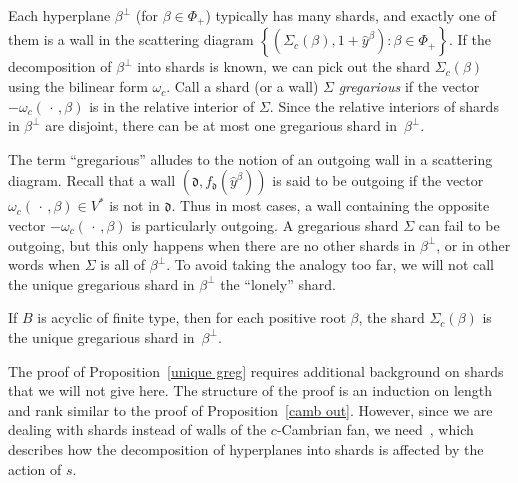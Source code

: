 \documentclass[ALCO,ThmDefs,Unicode,epreuves]{cedram}
\DeclareMathOperator{\CambScat}{CambScat}
\newcommand{\newword}[1]{\emph{#1}}
\newcommand{\set}[1]{{\left\lbrace #1 \right\rbrace}}
\renewcommand{\d}{{\mathfrak d}}
\newcommand{\hy}{\hat{y}}
\begin{document}
%

Each hyperplane $\beta^\perp$ (for $\beta\in\Phi_+$) typically has many shards, and exactly one of them is a wall in the scattering diagram $\set{(\Sigma_c(\beta),1+\hy^\beta):\beta\in\Phi_+}$.
If the decomposition of $\beta^\perp$ into shards is known, we can pick out the shard $\Sigma_c(\beta)$ using the bilinear form $\omega_c$.
Call a shard (or a wall) $\Sigma$ \newword{gregarious} if the vector $-\omega_c(\,\cdot\,,\beta)$ is in the relative interior of $\Sigma$.
Since the relative interiors of shards in $\beta^\perp$ are disjoint, there can be at most one gregarious shard in~$\beta^\perp$.

\begin{rema}\label{greg remark}
The term ``gregarious'' alludes to the notion of an outgoing wall in a scattering diagram.
Recall that a wall $(\d,f_\d(\hy^\beta))$ is said to be outgoing if the vector $\omega_c(\,\cdot\,,\beta)\in V^*$ is not in $\d$.
Thus in most cases, a wall containing the opposite vector $-\omega_c(\,\cdot\,,\beta)$ is particularly outgoing.
A gregarious shard $\Sigma$ can fail to be outgoing, but this only happens when there are no other shards in $\beta^\perp$, or in other words when $\Sigma$ is all of $\beta^\perp$.
To avoid taking the analogy too far, we will not call the unique gregarious shard in $\beta^\perp$ the ``lonely'' shard.
\end{rema}

\begin{prop}\label{unique greg}
If $B$ is acyclic of finite type, then for each positive root $\beta$, the shard $\Sigma_c(\beta)$ is the unique gregarious shard in~$\beta^\perp$.
\end{prop}

The proof of Proposition~\ref{unique greg} requires additional background on shards that we will not give here.
The structure of the proof is an induction on length and rank similar to the proof of Proposition~\ref{camb out}.
However, since we are dealing with shards instead of walls of the $c$-Cambrian fan, we need~\cite[Observation~4.7]{sort_camb}, which describes how the decomposition of hyperplanes into shards is affected by the action of $s$.
\end{document}
